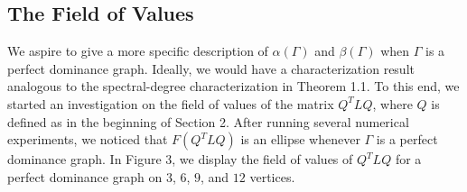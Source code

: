 \documentclass{article}
\begin{document}
\subsection{The Field of Values}
We aspire to give a more specific description of $\alpha(\Gamma)$ and $\beta(\Gamma)$ when $\Gamma$ is a perfect dominance graph. 
Ideally, we would have a characterization result analogous to the spectral-degree characterization in Theorem 1.1. 
To this end, we started an investigation on the field of values of the matrix $Q^{T}LQ$, where $Q$ is defined as in the beginning of Section 2.
After running several numerical experiments, we noticed that $F(Q^{T}LQ)$ is an ellipse whenever $\Gamma$ is a perfect dominance graph.
In Figure 3, we display the field of values of $Q^{T}LQ$ for a perfect dominance graph on $3$, $6$, $9$, and $12$ vertices.
\end{document}
